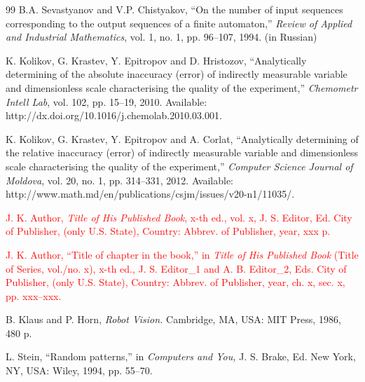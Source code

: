 \documentclass[11pt,a5paper,twoside]{article}
\begin{document}
\begin{thebibliography}{99}
  B.A. Sevastyanov and V.P. Chistyakov, ``On the number of input 
sequences corresponding to the output sequences of a finite automaton,'' 
\textit{Review of Applied and Industrial Mathematics}, vol. 1, no. 1, pp. 96--107, 1994. (in Russian)


 K. Kolikov, G. Krastev, Y. Epitropov and D. Hristozov, ``Analytically determining of the absolute inaccuracy (error) of indirectly measurable variable and dimensionless scale characterising the quality of the 
experiment,'' \textit{Chemometr Intell Lab}, vol. 102, pp. 15--19, 2010. Available: http://dx.doi.org/10.1016/j.chemolab.2010.03.001.

 K. Kolikov, G. Krastev, Y. Epitropov and A. Corlat, ``Analytically 
determining of the relative inaccuracy (error) of indirectly measurable 
variable and dimensionless scale characterising the quality of the 
experiment,'' \textit{Computer Science Journal of Moldova}, vol. 20, no. 1, pp. 
314--331, 2012. Available: 
http://www.math.md/en/publications/csjm/issues/v20-n1/11035/.




 \textcolor{red}{
J. K. Author, \textit{Title of His Published Book}, x-th ed., vol. x, J. S. Editor, Ed. City of Publisher, (only U.S. State), Country: Abbrev. of Publisher, year, xxx p.
} 


 \textcolor{red}{
J. K. Author, ``Title of chapter in the book,'' in \textit{Title of His Published Book} (Title of Series, vol./no. x), x-th ed., J. S. Editor\_1 and A. B. Editor\_2, Eds. City of Publisher, (only U.S. State), Country: Abbrev. of Publisher, year, ch. x, sec. x, pp. xxx--xxx. 
}

 B. Klaus and P. Horn, \textit{Robot Vision. }Cambridge, MA, USA: MIT Press, 1986, 480 p.  

 L. Stein, ``Random patterns,'' in \textit{Computers and You, }J. S. Brake, Ed. New York, NY, USA: Wiley, 1994, pp. 55--70. 


\end{thebibliography}
\end{document}
